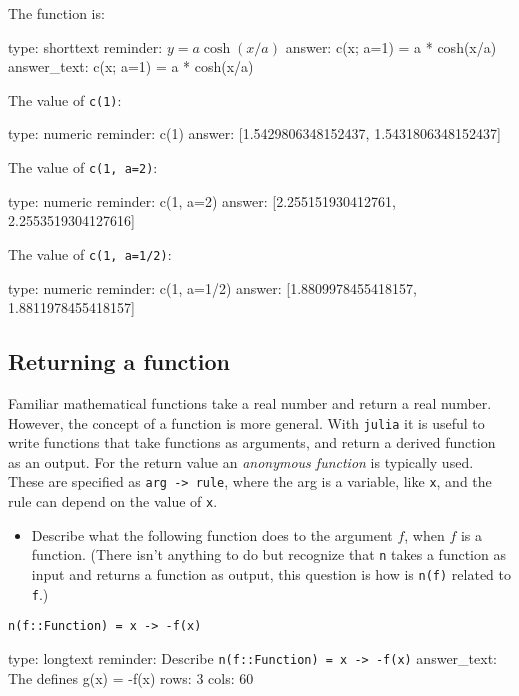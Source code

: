 \documentclass[12pt]{article}
\begin{document}
The function is:

\begin{answer}
type: shorttext
reminder: \( y = a \cosh(x/a) \)
answer: c(x; a=1) = a * cosh(x/a)
answer_text: c(x; a=1) = a * cosh(x/a) 
\end{answer}

The value of \texttt{c(1)}:

\begin{answer}
    type: numeric
    reminder: c(1)
    answer: [1.5429806348152437, 1.5431806348152437]

\end{answer}

The value of \texttt{c(1, a=2)}:

\begin{answer}
    type: numeric
    reminder: c(1, a=2)
    answer: [2.255151930412761, 2.2553519304127616]

\end{answer}

The value of \texttt{c(1, a=1/2)}:

\begin{answer}
    type: numeric
    reminder: c(1, a=1/2)
    answer: [1.8809978455418157, 1.8811978455418157]

\end{answer}

\subsection{Returning a function}

Familiar mathematical functions take a real number and return a real
number. However, the concept of a function is more general. With
\texttt{julia} it is useful to write functions that take functions as
arguments, and return a derived function as an output. For the return
value an \emph{anonymous function} is typically used. These are
specified as \texttt{arg -\textgreater{} rule}, where the arg is a
variable, like \texttt{x}, and the rule can depend on the value of
\texttt{x}.

\begin{itemize}
\itemsep1pt\parskip0pt
\item
  Describe what the following function does to the argument $f$, when
  $f$ is a function. (There isn't anything to do but recognize that
  \texttt{n} takes a function as input and returns a function as output,
  this question is how is \texttt{n(f)} related to \texttt{f}.)
\end{itemize}



\begin{verbatim}
n(f::Function) = x -> -f(x)
\end{verbatim}
\begin{answer}
type: longtext
reminder: Describe \verb+n(f::Function) = x -> -f(x)+
answer_text: The defines g(x) = -f(x) 
rows: 3
cols: 60
\end{answer}
\end{document}
